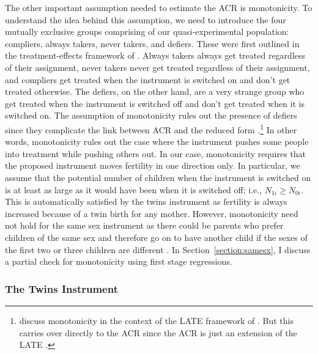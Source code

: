 The other important assumption needed to estimate the ACR is monotonicity. To understand the idea behind this assumption, we need to introduce the four mutually exclusive groups comprising of our quasi-experimental population: compliers, always takers, never takers, and defiers. These were first outlined in the treatment-effects framework of \textcite{angrist_identification_1996}.  Always takers always get treated regardless of their assignment, never takers never get treated regardless of their assignment, and compliers get treated when the instrument is switched on and don't get treated otherwise. The defiers, on the other hand, are a very strange group who get treated when the instrument is switched off and don't get treated when it is switched on. The assumption of monotonicity rules out the presence of defiers since they complicate the link between ACR and the reduced form \parencite{Angrist2009}.\footnote{\textcite{Angrist2009} discuss monotonicity in the context of the LATE framework of \textcite{imbens_identification_1994}. But this carries over directly to the ACR since the ACR is just an extension of the LATE \parencite[see][p.~181]{Angrist2009}.}  In other words, monotonicity rules out the case where the instrument pushes some people into treatment while pushing others out. In our case, monotonicity requires that the proposed instrument moves fertility in one direction only. In particular, we assume that the potential number of children when the instrument is switched on is at least as large as it would have been when it is switched off; i.e., $ N_{1i} \geq N_{0i} $. This is automatically satisfied by the twins instrument as fertility is always increased because of a twin birth for any mother. However, monotonicity need not hold for the same sex instrument as there could be parents who prefer children of the same sex and therefore go on to have another child if the sexes of the first two or three children are different \parencite{Huber2015}. In Section~\ref{section:samesx}, I discuss a partial check for monotonicity using first stage regressions. 



\subsubsection{The Twins Instrument}

%

